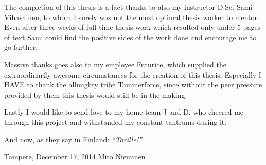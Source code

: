 The completion of this thesis is a fact thanks to also my instructor D.Sc. Sami Vihavainen, to whom I surely was not the most optimal thesis worker to mentor. Even after three weeks of full-time thesis work which resulted only under 5 pages of text Sami could find the positive sides of the work done and encourage me to go further.

Massive thanks goes also to my employee Futurice, which supplied the extraordinarily awesome circumstances for the creation of this thesis. Especially I HAVE to thank the allmighty tribe Tammerforce, since without the peer pressure provided by them this thesis would still be in the making. 

Lastly I would like to send love to my home team J and D, who cheered me through this project and withstanded my constant tantrums during it.

And now, as they say in Finland: \textit{``Torille!''}


\bigskip

\noindent 
Tampere, December 17, 2014
\noindent 
Miro Nieminen







\newpage
\tableofcontents










\newpage
\renewcommand{\chaptermark}[1]{\markboth{\thechapter. \ #1}{}}
\renewcommand{\sectionmark}[1]{\markright{}{}}
\lhead{\fancyplain{}{\leftmark}}
 

